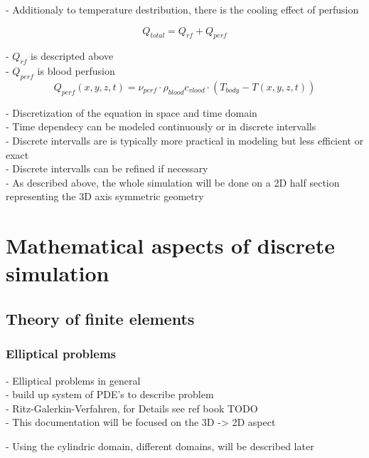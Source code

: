 \documentclass[parskip=half, titlepage=yes, 12pt, BCOR=12mm, DIV=calc]{scrartcl}
\begin{document}
- Additionaly to temperature destribution, there is the cooling effect of perfusion 

\begin{equation}
    Q_{total} = Q_{rf} + Q_{perf}
\end{equation}

- $Q_{rf}$ is descripted above \\
- $Q_{perf}$ is blood perfusion \\


\begin{equation}
    Q_{perf}(x,y,z,t) = \nu_{perf} \cdot \rho_{blood} c_{vlood} \cdot (T_{body} - T(x,y,z,t))
\end{equation}


- Discretization of the equation in space and time domain \\
- Time dependecy can be modeled continuously or in discrete intervalls \\
- Discrete intervalls are is typically more practical in modeling but less efficient or exact \\
- Discrete intervalls can be refined if necessary \\

- As described above, the whole simulation will be done on a 2D half section representing the 3D axis symmetric geometry \\ 


\section{Mathematical aspects of discrete simulation}

\subsection{Theory of finite elements}

\subsubsection{Elliptical problems}
- Elliptical problems in general \\
- build up system of PDE's to describe problem \\

- Ritz-Galerkin-Verfahren, for Details see ref book TODO \\
- This documentation will be focused on the 3D -> 2D aspect


- Using the cylindric domain, different domains, will be described later \\
\end{document}
